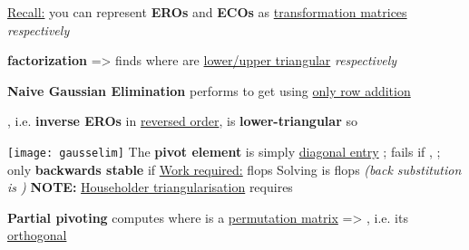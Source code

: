 \underline{Recall:} you can represent \textbf{EROs} and
\textbf{ECOs} as \underline{transformation matrices} 
\emph{respectively}

\textbf{ factorization} => finds 
where  are \underline{lower/upper triangular} \emph{respectively}

\hSep %

\textbf{Naive Gaussian Elimination} performs
\iMbox{ [I_{m} \ | \ A \ | \ I_{n}] \rightsquigarrow [R^{-1} \ | \ U \ | \ I_{n}]}
to get  using \underline{only row addition}
\begin{itemize}
      \vItem
            , i.e. \textbf{inverse EROs} in \underline{reversed order}, is
            \textbf{lower-triangular} so 

            \texttt{[image: gausselim]}
      \vItem
            The \textbf{pivot element} is simply \underline{diagonal entry}
            ; fails if
      \vItem
            ,
            ;
            only \textbf{backwards stable} if
      \vItem
            \underline{Work required:}  flops
      \vItem
            Solving  is  flops
            \emph{(back substitution is )}
      \vItem
            \textbf{NOTE:} \underline{Householder triangularisation} requires
\end{itemize}

\hSep %

\textbf{Partial pivoting} computes  where  is
a \underline{permutation matrix} => , i.e. its \underline{orthogonal}

